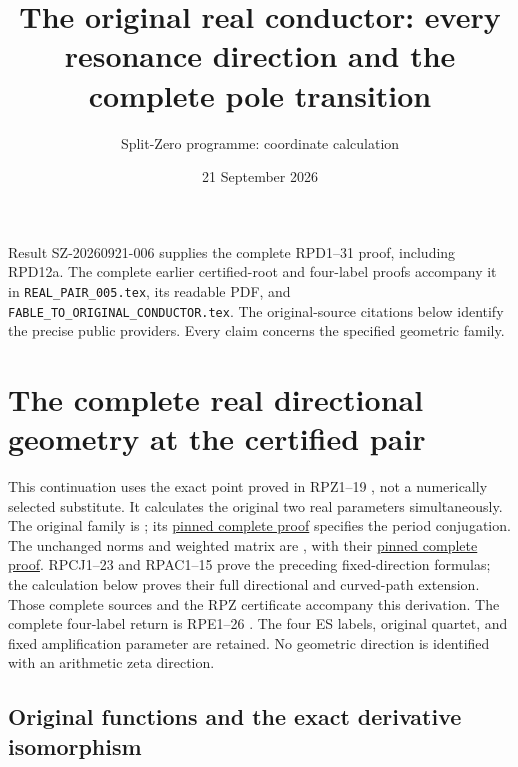 \documentclass[11pt]{article}
\title{The original real conductor: every resonance direction and the complete pole transition}
\author{Split-Zero programme: coordinate calculation}
\date{21 September 2026}
\begin{document}
\maketitle
\noindent Result SZ-20260921-006 supplies the complete RPD1--31 proof,
including RPD12a.  The complete earlier certified-root and four-label
proofs accompany it in \nolinkurl{REAL_PAIR_005.tex}, its readable
PDF, and \nolinkurl{FABLE_TO_ORIGINAL_CONDUCTOR.tex}.
The original-source citations below identify the precise public
providers.  Every claim concerns the specified geometric family.
\tableofcontents\clearpage
\section{The complete real directional geometry at the certified pair}
\label{sec:real-pair-directional}

This continuation uses the exact point proved in RPZ1--19
\cite{RPZ005}, not a
numerically selected substitute.  It calculates the original two real
parameters simultaneously.  The original family is
\cite[PCL1--10]{PCLOriginal}; its
\href{https://github.com/KokunoYumeto/zeta-function-research-reader/blob/487253b5b01851da5b9b98af4e146fecf1fab902/workbenches/splitzero-tandem/continuations/20260919-native-conductor-coprimality/providers/PCL_COMPLETE.tex#L19}{pinned complete proof}
specifies the period conjugation.  The unchanged norms and weighted
matrix are \cite[WCF1--6]{WCF}, with their
\href{https://github.com/KokunoYumeto/zeta-function-research-reader/blob/5992ad50c0f2a06921f1fcaded7b4e38097c0739/workbenches/splitzero-tandem/continuations/20260920-original-kernel-mixed-determinants/providers/WEIGHTED_CONDUCTOR_FORWARD.tex#L28}{pinned complete proof}.
RPCJ1--23 and RPAC1--15 \cite{RPCJ005,RPAC005} prove the preceding fixed-direction formulas;
the calculation below proves their full directional and curved-path
extension.  Those complete sources and the RPZ certificate accompany
this derivation.  The complete four-label return is RPE1--26 \cite{RPE005}.
The four ES labels, original quartet, and fixed
amplification parameter are retained.  No geometric direction is
identified with an arithmetic zeta direction.

\subsection{Original functions and the exact derivative isomorphism}
\end{document}
